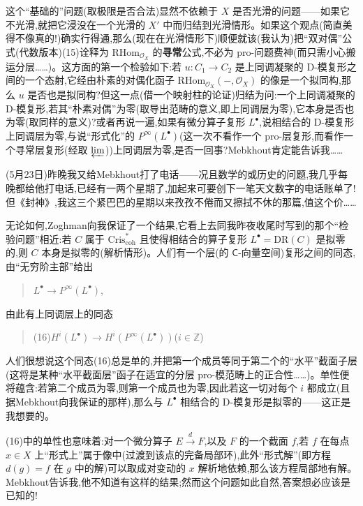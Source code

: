 \noindent 这个“基础的”问题(取极限是否合法)显然不依赖于 $X$ 是否光滑的问题——如果它不光滑,就把它浸没在一个光滑的 $X'$ 中而归结到光滑情形。如果这个观点(简直美得不像真的!)确实行得通,那么(现在在光滑情形下)顺便就该(我认为)把“双对偶”公式(代数版本)(15)诠释为 $\mathrm{RHom}_{\mathcal{O}_{X}}$ 的\textbf{寻常}公式,不必为 pro-问题费神(而只需小心搬运分层……)。这方面的第一个检验如下:若 $u : C_{1}\to C_{2}$ 是上同调凝聚的 D-模复形之间的一个态射,它经由朴素的对偶化函子 $\mathrm{RHom}_{\mathcal{O}_{X}}(-,\mathcal{O}_{X})$ 的像是一个拟同构,那么 $u$ 是否也是拟同构?但这一点(借一个映射柱的论证)归结为问:一个上同调凝聚的 D-模复形,若其“朴素对偶”为零(取导出范畴的意义,即上同调层为零),它本身是否也为零(取同样的意义)?或者再说一遍,如果有微分算子复形 $L^{\bullet}$,说相结合的 D-模复形上同调层为零,与说“形式化”的 $P^{\infty}(L^{\bullet})$(这一次不看作一个 pro-层复形,而看作一个寻常层复形(经取 $\varprojlim$))上同调层为零,是否一回事?Mebkhout肯定能告诉我……

\dmark{}(5月23日)昨晚我又给Mebkhout打了电话——况且数学的或历史的问题,我几乎每晚都给他打电话,已经有一两个星期了,加起来可要创下一笔天文数字的电话账单了!但《封神》,我这三个紧巴巴的星期以来孜孜不倦而又擦拭不休的那篇,值这个价……

\noindent 无论如何,Zoghman向我保证了一个结果,它看上去同我昨夜收尾时写到的那个“检验问题”相近:若 $C$ 属于 $\mathrm{Cris}^{*}_{\mathrm{coh}}$ 且使得相结合的算子复形 $L^{\bullet}=\mathrm{DR}(C)$ 是拟零的,则 $C$ 本身是拟零的(解析情形)。人们有一个层(的 $\mathsf{C}$-向量空间)复形之间的同态,由“无穷阶主部”给出
\begin{quote}
$L^{\bullet}\longrightarrow P^{\infty}(L^{\bullet})$,
\end{quote}
由此有上同调层上的同态
\begin{quote}
(16)\quad $H^{i}(L^{\bullet})\longrightarrow H^{i}(P^{\infty}(L^{\bullet}))$\quad ($i\in\mathbb{Z}$)
\end{quote}
人们很想说这个同态(16)总是单的,并把第一个成员等同于第二个的“水平”截面子层(这将是某种“水平截面层”函子在适宜的分层 pro-模范畴上的正合性……)。单性便将蕴含:若第二个成员为零,则第一个成员也为零,因此若这一切对每个 $i$ 都成立(且据Mebkhout向我保证的那样),那么与 $L^{\bullet}$ 相结合的 D-模复形是拟零的——这正是我想要的。

\noindent (16)中的单性也意味着:对一个微分算子 $E\overset{d}{\longrightarrow}F$,以及 $F$ 的一个截面 $f$,若 $f$ 在每点 $x\in X$ 上“形式上”属于像中(过渡到该点的完备局部环),此外“形式解”(即方程 $d(g)=f$ 在 $g$ 中的解)可以取成对变动的 $x$ 解析地依赖,那么该方程局部地有解。Mebkhout告诉我,他不知道有这样的结果;然而这个问题如此自然,答案想必应该是已知的!


